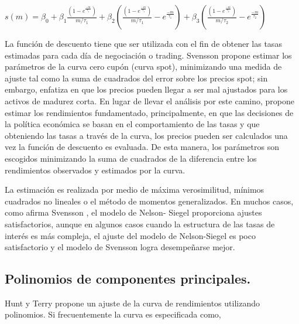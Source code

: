 \begin{center}
$\displaystyle{s(m) = \beta_{0}+ \beta_{1}\frac{\left(1-e^\frac{-m}{\tau_{1}}\right)}{m/\tau_{1}} + \beta_{2} \left(\frac{\left(1-e^\frac{-m}{\tau_{1}}\right)}{m/\tau_{1}} -  e^\frac{-m}{\tau_{1}}\right) + \beta_{3} \left(\frac{\left(1-e^\frac{-m}{\tau_{2}}\right)}{m/\tau_{2}} -  e^\frac{-m}{\tau_{2}}\right)}$
\end{center}

\vspace*{0.2 cm}

\hspace*{0.4 cm} La funci\'on de descuento tiene que ser utilizada con el fin de obtener las
tasas estimadas para cada d\'ia de negociaci\'on o trading. Svensson \cite{Sv}
propone estimar los par\'ametros de la curva cero cup\'on (curva spot),
minimizando una medida de ajuste tal como la suma de cuadrados del
error sobre los precios spot; sin embargo, enfatiza en que los precios
pueden llegar a ser mal ajustados para los activos de madurez corta. En
lugar de llevar el an\'alisis por este camino, propone estimar los
rendimientos fundamentado, principalmente, en que las decisiones de la
pol\'itica econ\'omica se basan en el comportamiento de las tasas y que
obteniendo las tasas a trav\'es de la curva, los precios pueden ser
calculados una vez la funci\'on de descuento es evaluada. De esta manera,
los par\'ametros son escogidos minimizando la suma de cuadrados de la
diferencia entre los rendimientos observados y estimados por la curva.

\hspace*{0.4 cm} La estimaci\'on es realizada por medio de m\'axima verosimilitud, m\'inimos
cuadrados no lineales o el m\'etodo de momentos generalizados. En
muchos casos, como afirma Svensson \cite{Sv}, el modelo de Nelson-
Siegel proporciona ajustes satisfactorios, aunque en algunos casos
cuando la estructura de las tasas de inter\'es es m\'as compleja, el ajuste del
modelo de Nelson-Siegel es poco satisfactorio y el modelo de Svensson
logra desempe\~narse mejor.


\subsection{Polinomios de componentes principales.\\}


\hspace*{0.4 cm} Hunt y Terry \cite{HT} propone un ajuste de la curva de rendimientos
utilizando polinomios. Si frecuentemente la curva es especificada como,

